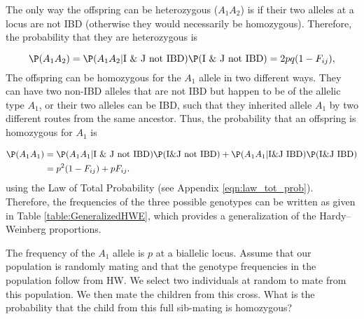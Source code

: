 {{The only way the offspring can be heterozygous ($A_1 A_2$) is if their two
alleles at a locus are not IBD (otherwise they would necessarily be
homozygous). Therefore, the probability that they are heterozygous is

\begin{equation}
\P(A_1 A_2) = \P(A_1 A_2 |\textrm{I \& J not IBD} ) \P (\textrm{I \& J not IBD} ) = 2p q (1-F_{ij}) ,
\label{eq:hetGenHW}
\end{equation}
%
 The offspring
can be homozygous for the $A_1$ allele in two different ways.  They can have
two non-IBD alleles that are not IBD but happen to be of the allelic type
$A_1$, or their two alleles can be IBD, such that they inherited allele $A_1$
by two different routes from the same ancestor. Thus, the probability that an
offspring is homozygous for $A_1$ is

\begin{align}
\P(A_1 A_1) & = \P(A_1 A_1 |\textrm{I \& J not IBD} ) \P (\textrm{I\&J
  not IBD} ) + \P(A_1 A_1 |\textrm{I\&J IBD} ) \P (\textrm{I\&J IBD}) \nonumber\\
             &= p^2(1-F_{ij})  + pF_{ij}.
\end{align}
%
using the Law of Total Probability (see Appendix
\eqn \eqref{eqn:law_tot_prob}).  Therefore, the frequencies of the three possible genotypes can be written as given in
Table \ref{table:GeneralizedHWE}, which provides a generalization of the Hardy--Weinberg
proportions.\\



\begin{question}{}
The frequency of the $A_1$ allele is $p$ at a biallelic locus. Assume that our population is randomly mating and that the
genotype frequencies in the population follow from HW. We select two
individuals at random to mate from this population. We then mate the children
from this cross. What is the probability that the child from this full
sib-mating is
homozygous?
\end{question}

}}
